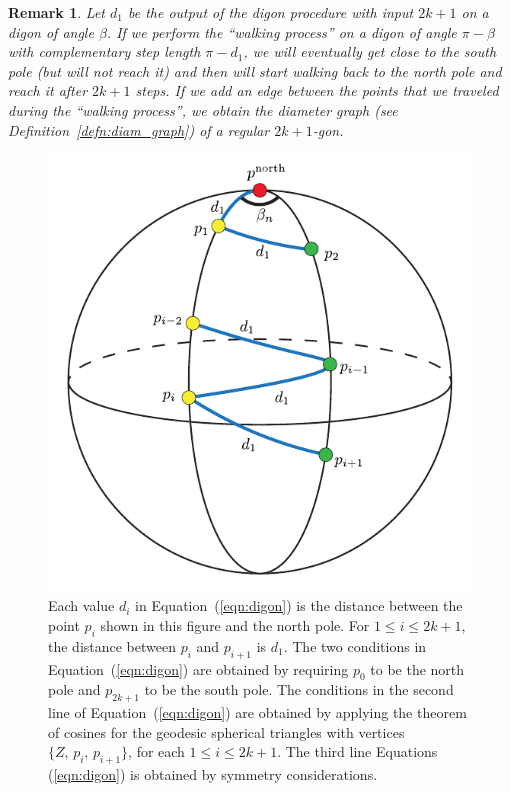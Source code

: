 \documentclass[12pt]{amsart}
\theoremstyle{plain}
\newtheorem{remark}[theorem]{Remark}
\newcommand{\np}{Z}
\numberwithin{equation}{section}
\begin{document}
\begin{remark}
Let $d_1$ be the output of the digon procedure with input $2k+1$ on a
digon of angle $\beta$.  If we perform the ``walking process'' on a
digon of angle $\pi-\beta$ with complementary step length $\pi - d_1$,
we will eventually get close to the south pole (but will not reach it)
and then will start walking back to the north pole and reach it after
$2k+1$ steps. If we add an edge between the points that we traveled
during the ``walking process'', we obtain the diameter graph (see Definition~\ref{defn:diam_graph}) of a
regular $2k+1$-gon.
\end{remark}
\begin{figure}
    \centering
    \includegraphics[scale=0.75]{./figures/digon.pdf}
    \caption{Each value $d_i$ in Equation~(\ref{eqn:digon}) is the distance between the point  $p_i$ shown in this figure and the north pole.
		For  $1\leq i\leq 2k+1$, the distance between $p_i$ and $p_{i+1}$ is $d_1$.
		The two conditions in Equation~(\ref{eqn:digon}) are obtained by requiring $p_0$ to be the north pole and $p_{2k+1}$ to be the south pole.
		The conditions in the second line of Equation~(\ref{eqn:digon}) are obtained by applying the theorem of cosines for the geodesic spherical triangles with vertices $\{\np,\,p_i,\,p_{i+1}\}$, for each $1\leq i \leq 2k+1$.
		The third line  Equations (\ref{eqn:digon}) is obtained by symmetry considerations.}
    \label{fig:eqs}
\end{figure}
\end{document}
